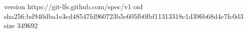 version https://git-lfs.github.com/spec/v1
oid sha256:bd940dba1e3cd48547fd960723b5c605fb0fbf11313318c1d396b68d4c7fc0d3
size 349692
